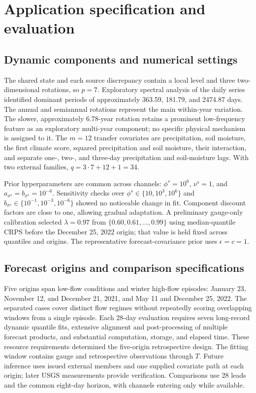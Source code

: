 \section{Application specification and evaluation}

\subsection{Dynamic components and numerical settings}
\label{env:subsec:specification}

The shared state and each source discrepancy contain a local level and three
two-dimensional rotations, so $p=7$. Exploratory spectral analysis of the
daily series identified dominant periods of approximately 363.59, 181.79, and
2474.87 days. The annual and semiannual rotations represent the main
within-year variation. The slower, approximately 6.78-year rotation retains a
prominent low-frequency feature as an exploratory multi-year component; no
specific physical mechanism is assigned to it. The $m=12$ transfer covariates are
precipitation, soil moisture, the first climate score, squared precipitation
and soil moisture, their interaction, and separate one-, two-, and three-day
precipitation and soil-moisture lags. With two external families,
$q=3\cdot7+12+1=34$.

Prior hyperparameters are common across channels:
$\phi^s=10^6$, $\nu^s=1$, and
$a_{\sigma^s}=b_{\sigma^s}=10^{-6}$. Sensitivity checks over
$\phi^s\in\{10,10^3,10^6\}$ and
$b_{\sigma^s}\in\{10^{-1},10^{-3},10^{-6}\}$ showed no noticeable change
in fit. Component discount factors are close to one, allowing gradual
adaptation. A preliminary gauge-only calibration selected $\lambda=0.97$
from $\{0.60,0.61,\ldots,0.99\}$ using median-quantile CRPS before the
December 25, 2022 origin; that value is held fixed across quantiles and
origins. The representative forecast-covariance prior uses $\epsilon=c=1$.

\subsection{Forecast origins and comparison specifications}

Five origins span low-flow conditions and winter high-flow episodes: January
23, November 12, and December 21, 2021, and May 11 and December 25, 2022.
The separated cases cover distinct flow regimes without repeatedly scoring
overlapping windows from a single episode. Each 28-day evaluation requires
seven long-record dynamic quantile fits, extensive alignment and
post-processing of multiple forecast products, and substantial computation,
storage, and elapsed time. These resource requirements determined the
five-origin retrospective design. The fitting window contains gauge and
retrospective observations through $T$. Future inference uses issued external
members and one supplied covariate path at each origin; later USGS measurements
provide verification. Comparisons use 28 leads and the common eight-day
horizon, with channels entering only while available.

